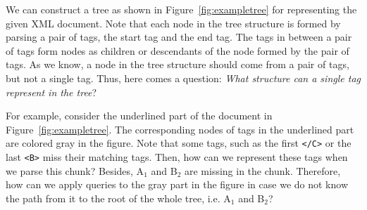 We can construct a tree as shown in Figure~\ref{fig:exampletree} for
representing the given XML document. Note that each node in the tree structure
is formed by parsing a pair of tags, the start tag and the end tag. The tags in
between a pair of tags form nodes as children or descendants of the node formed
by the pair of tags. As we know, a node in the tree structure should come from a
pair of tags, but not a single tag. Thus, here comes a question: \emph{What
structure can a single tag represent in the tree\/}?

For example, consider the underlined part of the document in
Figure~\ref{fig:exampletree}. The corresponding nodes of tags in the underlined
part are colored gray in the figure. Note that some tags, such as the first
\verb|</C>| or the last \verb|<B>| miss their matching tags. Then, how can we
represent these tags when we parse this chunk?  Besides, A$_1$ and B$_2$ are
missing in the chunk. Therefore, how can we apply  queries to the gray part in
the figure in case we do not know the path  from it to the root of the whole
tree, i.e.  A$_1$ and B$_2$?

